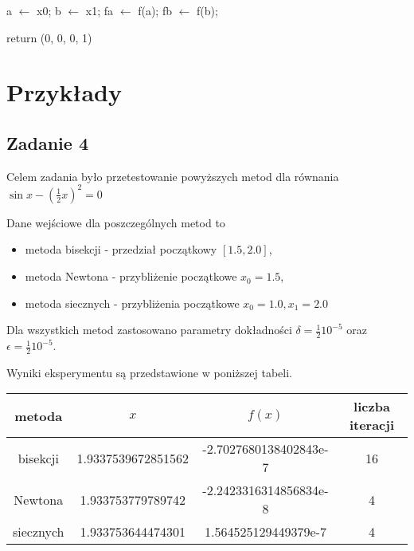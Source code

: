 \documentclass{article}
\begin{document}
\begin{algorithm}[H]

  a $\leftarrow$ x0;
  b $\leftarrow$ x1;
  fa $\leftarrow$ f(a);
  fb $\leftarrow$ f(b);


  return (0, 0, 0, 1)
  

\end{algorithm}

\section{Przykłady}

\subsection{Zadanie 4}

Celem zadania było przetestowanie powyższych metod dla równania
$\sin x - (\frac{1}{2}x)^2 = 0$

Dane wejściowe dla poszczególnych metod to
\begin{itemize}
  \item metoda bisekcji - przedział początkowy $[1.5, 2.0]$,
  \item metoda Newtona - przybliżenie początkowe $x_0 = 1.5$,  
  \item metoda siecznych - przybliżenia początkowe $x_0 = 1.0, x_1 = 2.0$
\end{itemize}
Dla wszystkich metod zastosowano parametry dokładności $\delta = \frac{1}{2}10^{-5}$ oraz $\epsilon = \frac{1}{2}10^{-5}$.

Wyniki eksperymentu są przedstawione w poniższej tabeli.

\begin{tabular}{|c|c|c|c|}
\hline
metoda & $x$ & $f(x)$ & liczba iteracji \\
\hline
bisekcji &  1.9337539672851562   &    -2.7027680138402843e-7 & 16 \\
Newtona & 1.933753779789742  & -2.2423316314856834e-8 & 4  \\
siecznych & 1.933753644474301 & 1.564525129449379e-7 & 4 \\
\hline
\end{tabular}
\end{document}
